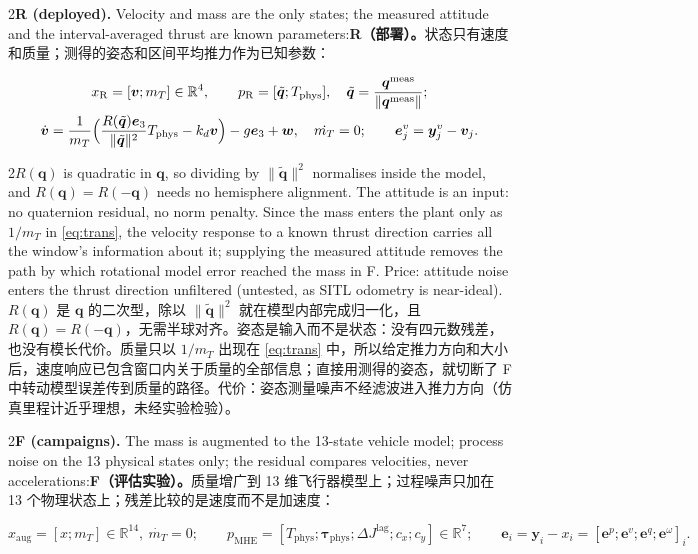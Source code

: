 \documentclass[10pt,a4paper]{article}
\numberwithin{equation}{section}
\newcommand{\dJ}{\Delta J}
\newcommand{\mT}{m_T}
\newcommand{\Tphys}{T_{\mathrm{phys}}}
\newcommand{\tauphys}{\bm{\tau}_{\mathrm{phys}}}
\newcommand{\ev}{\bm{e}_3}
\newcommand{\pair}[2]{\begin{paracol}{2}#1\switchcolumn #2\end{paracol}}
\begin{document}
\pair{\textbf{R (deployed).} Velocity and mass are the only states; the
measured attitude and the interval-averaged thrust are known parameters:}
{\textbf{R（部署）。}状态只有速度和质量；测得的姿态和区间平均推力作为已知参数：}
\begin{equation}
\begin{gathered}
x_{\mathrm R}=[\bm v;\mT]\in\mathbb R^4,\qquad p_{\mathrm R}=[\tilde{\bm q};\Tphys],\quad \tilde{\bm q}=\frac{\bm q^{\mathrm{meas}}}{\lVert\bm q^{\mathrm{meas}}\rVert};\\
\dot{\bm v}=\frac{1}{\mT}\Bigl(\frac{R(\tilde{\bm q})\ev}{\lVert\tilde{\bm q}\rVert^2}\Tphys-k_d\bm v\Bigr)-g\ev+\bm w,\quad \dot{\mT}=0;\qquad
\bm e^v_j=\bm y^v_j-\bm v_j .
\end{gathered}
\label{eq:redmodel}
\end{equation}
\pair{$R(\bm q)$ is quadratic in $\bm q$, so dividing by $\lVert\tilde{\bm q}\rVert^2$
normalises inside the model, and $R(\bm q)=R(-\bm q)$ needs no hemisphere
alignment. The attitude is an input: no quaternion residual, no norm penalty.
Since the mass enters the plant only as $1/\mT$ in \eqref{eq:trans}, the
velocity response to a known thrust direction carries all the window's
information about it; supplying the measured attitude removes the path by which
rotational model error reached the mass in F. Price: attitude noise enters the
thrust direction unfiltered (untested, as SITL odometry is near-ideal).}
{$R(\bm q)$ 是 $\bm q$ 的二次型，除以 $\lVert\tilde{\bm q}\rVert^2$ 就在模型内部完成归一化，且 $R(\bm q)=R(-\bm q)$，无需半球对齐。姿态是输入而不是状态：没有四元数残差，也没有模长代价。质量只以 $1/\mT$ 出现在 \eqref{eq:trans} 中，所以给定推力方向和大小后，速度响应已包含窗口内关于质量的全部信息；直接用测得的姿态，就切断了 F 中转动模型误差传到质量的路径。代价：姿态测量噪声不经滤波进入推力方向（仿真里程计近乎理想，未经实验检验）。}

\pair{\textbf{F (campaigns).} The mass is augmented to the 13-state vehicle
model; process noise on the 13 physical states only; the residual compares
velocities, never accelerations:}
{\textbf{F（评估实验）。}质量增广到 13 维飞行器模型上；过程噪声只加在 13 个物理状态上；残差比较的是速度而不是加速度：}
\begin{equation}
x_{\mathrm{aug}}=[x;\mT]\in\mathbb R^{14},\ \dot{\mT}=0;\qquad
p_{\mathrm{MHE}}=[\Tphys;\tauphys;\dJ^{\mathrm{lag}};c_x;c_y]\in\mathbb R^{7};\qquad
\bm e_i=\bm y_i-x_i=[\bm e^p;\bm e^v;\bm e^q;\bm e^\omega]_i .
\end{equation}
\end{document}
